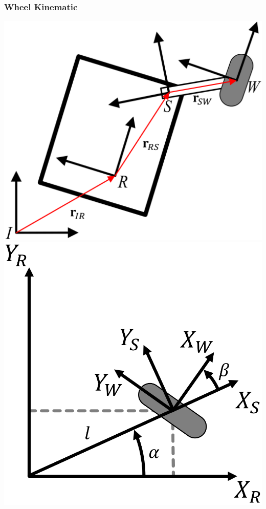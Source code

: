 \subsubsection{Wheel Kinematic}
\includegraphics[width=\linewidth]{./Figures/03_WheelEquation.png}
\includegraphics[width=\linewidth]{./Figures/03_StandardWheel.png}
